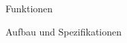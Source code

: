 \label{Erhöhung der Sicherheit durch VoIP-Firewalls}

 \label{Funktionen}
 \begin{section}{Funktionen}
 \end{section}
 
 \label{Aufbau und Spezifikationen}
 \begin{section}{Aufbau und Spezifikationen}
 \end{section}

